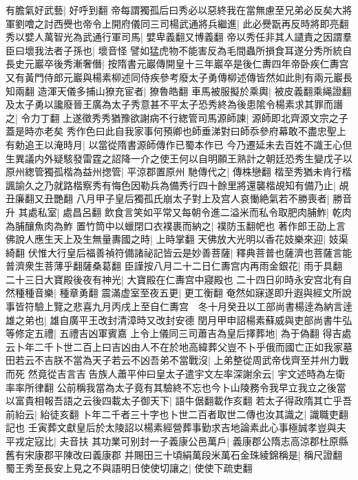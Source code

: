 有膽氣好武藝|{
	好呼到翻}
帝每謂獨孤后曰秀必以惡終我在當無慮至兄弟必反矣大將軍劉噲之討西㸑也帝令上開府儀同三司楊武通將兵繼進|{
	此必㸑翫再反時將即亮翻}
秀以嬖人萬智光為武通行軍司馬|{
	嬖卑義翻又博義翻}
帝以秀任非其人譴責之因謂羣臣曰壞我法者子孫也|{
	壞音怪}
譬如猛虎物不能害反為毛間蟲所損食耳遂分秀所統自長史元巖卒後秀漸奢僭|{
	按隋書元巖傳開皇十三年巖卒是後仁夀四年帝卧疾仁夀宫又有黃門侍郎元巖與楊素柳述同侍疾參考廢太子勇傳柳述傳皆然如此則有兩元巖長知兩翻}
造渾天儀多捕山獠充宦者|{
	獠魯皓翻}
車馬被服擬於乘輿|{
	被皮義翻乘䋲證翻}
及太子勇以讒廢晉王廣為太子秀意甚不平太子恐秀終為後患隂令楊素求其罪而譖之|{
	令力丁翻}
上遂徵秀秀猶豫欲謝病不行緫管司馬源師諫|{
	源師即北齊源文宗之子蓋是時亦老矣}
秀作色曰此自我家事何預卿也師垂涕對曰師忝參府幕敢不盡忠聖上有勅追王以淹時月|{
	以當從隋書源師傳作已蜀本作已}
今乃遷延未去百姓不識王心但生異議内外疑駭發雷霆之詔降一介之使王何以自明願王熟計之朝廷恐秀生變戊子以原州緫管獨孤楷為益州揔管|{
	平涼郡置原州}
馳傳代之|{
	傳株戀翻}
楷至秀猶未肯行楷諷諭久之乃就路楷察秀有悔色因勒兵為備秀行四十餘里將還襲楷覘知有備乃止|{
	覘丑廉翻又丑艷翻}
八月甲子皇后獨孤氏崩太子對上及宫人哀慟絶氣若不勝喪者|{
	勝音升}
其處私室|{
	處昌呂翻}
飲食言笑如平常又每朝令進二溢米而私令取肥肉脯鮓|{
	乾肉為脯釀魚肉為鮓}
置竹筒中以蠟閉口衣襆裹而納之|{
	襆防玉翻帊也}
著作郎王劭上言佛說人應生天上及生無量夀國之時|{
	上時掌翻}
天佛放大光明以香花妓樂來迎|{
	妓渠綺翻}
伏惟大行皇后福善禎符備諸祕記皆云是妙善菩薩|{
	釋典菩普也薩濟也菩薩言能普濟衆生菩薄乎翻薩桑葛翻}
臣謹按八月二十二日仁夀宫内再雨金銀花|{
	雨于具翻}
二十三日大寶殿後夜有神光|{
	大寶殿在仁夀宫中寢殿也}
二十四日卯時永安宫北有自然種種音樂|{
	種章勇翻}
震滿虚室至夜五更|{
	更工衡翻}
奄然如寐遂即升遐與經文所說事皆符驗上覽之悲喜九月丙戌上至自仁夀宫　冬十月癸丑以工部尚書楊逹為納言逹雄之弟也|{
	雄自廣平王改封清漳時又改封安德}
閏月甲申詔楊素蘇威與吏部尚書牛弘等修定五禮|{
	五禮吉凶軍賓嘉}
上令上儀同三司蕭吉為皇后擇葬地|{
	為于偽翻}
得吉處云卜年二千卜世二百上曰吉凶由人不在於地高緯葬父豈不卜乎俄而國亡正如我家墓田若云不吉朕不當為天子若云不凶吾弟不當戰沒|{
	上弟整從周武帝伐齊至并州力戰而死}
然竟從吉言吉告族人蕭平仲曰皇太子遣宇文左率深謝余云|{
	宇文述時為左衛率率所律翻}
公前稱我當為太子竟有其驗終不忘也今卜山陵務令我早立我立之後當以富貴相報吾語之云後四載太子御天下|{
	語牛倨翻載作亥翻}
若太子得政隋其亡乎吾前紿云|{
	紿徒亥翻}
卜年二千者三十字也卜世二百者取世二傳也汝其識之|{
	識職吏翻記也}
壬寅葬文獻皇后於太陵詔以楊素經營葬事勤求吉地論素此心事極誠孝豈與夫平戎定寇比|{
	夫音扶}
其功業可别封一子義康公邑萬戶|{
	義康郡公隋志高涼郡杜原縣舊有宋康郡平陳改曰義康郡}
并賜田三十頃絹萬段米萬石金珠綾錦稱是|{
	稱尺證翻}
蜀王秀至長安上見之不與語明日使使切讓之|{
	使使下疏吏翻}
